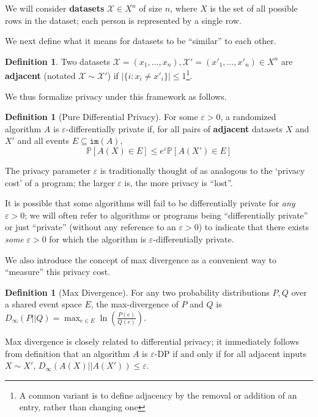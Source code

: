 \documentclass[12pt]{article}
\newcommand{\PP}{\mathbb{P}}
\newcommand{\im}{\texttt{im}}
\theoremstyle{definition}
\newtheorem{defn}[thm]{Definition}
\begin{document}
We will consider \textbf{datasets} $\mathcal{X}\in X^n$ of size $n$, where $X$ is the set of all possible rows in the dataset; each person is represented by a single row. 

We next define what it means for datasets to be ``similar'' to each other. 

\begin{defn}
    Two datasets $\mathcal{X}=(x_1, \ldots, x_n), \mathcal{X}'=(x'_1, \ldots, x'_n)\in X^n$ are \textbf{adjacent} (notated $\mathcal{X}\sim\mathcal{X}'$) if $|\{i: x_i\neq x'_i\}|\leq 1$\footnote{A common variant is to define adjacency by the removal or addition of an entry, rather than changing one}.
\end{defn}

We thus formalize privacy under this framework as follows.
\begin{defn}[Pure Differential Privacy]
    For some $\varepsilon>0$, a randomized algorithm $A$ is $\varepsilon$-differentially private if, for all pairs of \textbf{adjacent} datasets $X$ and $X'$ and all events $E \subseteq \im(A)$, \[\PP[A(X) \in E]\leq e^\varepsilon \PP[A(X')\in E]\]
\end{defn}

The privacy parameter $\varepsilon$ is traditionally thought of as analogous to the `privacy cost' of a program; the larger $\varepsilon$ is, the more privacy is ``lost''.

It is possible that some algorithms will fail to be differentially private for \textit{any} $\varepsilon>0$; we will often refer to algorithms or programs being ``differentially private'' or just ``private'' (without any reference to an $\varepsilon>0$) to indicate that there exists \textit{some} $\varepsilon>0$ for which the algorithm is $\varepsilon$-differentially private. 

We also introduce the concept of max divergence as a convenient way to ``measure'' this privacy cost.

\begin{defn}[Max Divergence]
    For any two probability distributions $P, Q$ over a shared event space $E$, the max-divergence of $P$ and $Q$ is 
    $D_{\infty}(P||Q) = \max_{e\in E}\ln\left(\frac{P(e)}{Q(e)}\right)$.
\end{defn}

Max divergence is closely related to differential privacy; it immediately follows from definition that an algorithm $A$ is $\varepsilon$-DP if and only if for all adjacent inputs $X\sim X'$, $D_{\infty}(A(X)||A(X'))\leq \varepsilon$. 
\end{document}
